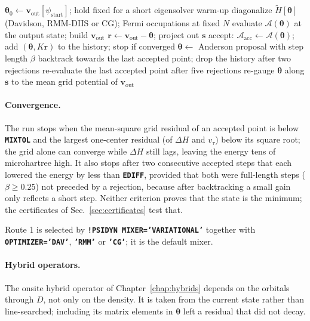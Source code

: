 \documentclass[11pt,a4paper,oneside]{book}
\newcommand{\vth}{\bm\theta}
\newcommand{\vout}{\bm v_{\mathrm{out}}}
\newcommand{\key}[1]{\textbf{\texttt{#1}}}
\begin{document}
\begin{algorithm}[t]
\caption{Hamiltonian-space variational SCF (Route 1).}
\begin{algorithmic}[1]
\State $\vth_0\gets\vout[\psi_{\mathrm{start}}]$; hold fixed for a short eigensolver warm-up
\Loop
  \State diagonalize $\tilde H[\vth]$ (Davidson, RMM-DIIS or CG); Fermi occupations at fixed $N$
  \State evaluate $\mathcal A(\vth)$ at the output state; build $\vout$
  \State $\bm r\gets\vout-\vth$; project out $\bm s$
  \If{$\mathcal A(\vth)\le\mathcal A_{\mathrm{acc}}+\epsilon$}
    \State accept: $\mathcal A_{\mathrm{acc}}\gets\mathcal A(\vth)$; add $(\vth,K\bm r)$ to the history; stop if converged
    \State $\vth\gets$ Anderson proposal with step length $\beta$
  \Else
    \State backtrack towards the last accepted point; drop the history after two rejections
    \State re-evaluate the last accepted point after five rejections
  \EndIf
  \State re-gauge $\vth$ along $\bm s$ to the mean grid potential of $\vout$
\EndLoop
\end{algorithmic}
\end{algorithm}

\paragraph{Convergence.} The run stops when the mean-square grid
residual of an accepted point is below \key{MIXTOL} and the largest
one-center residual (of $\Delta H$ and $v_\tau$) below its square root;
the grid alone can converge while $\Delta H$ still lags, leaving the energy
tens of microhartree high. It also stops after two consecutive accepted
steps that each lowered the energy by less than \key{EDIFF}, provided
that both were full-length steps ($\beta\ge0.25$) not preceded by a
rejection, because after backtracking a small gain only reflects a
short step. Neither criterion proves that the state is the minimum; the
certificates of Sec.~\ref{sec:certificates} test that.

Route 1 is selected by \key{!PSIDYN MIXER='VARIATIONAL'} together with
\key{OPTIMIZER='DAV'}, \key{'RMM'} or \key{'CG'}; it is the default mixer.

\paragraph{Hybrid operators.} The onsite hybrid operator of
Chapter~\ref{chap:hybrids} depends on the orbitals through $D$, not only
on the density. It is taken from the current state rather than
line-searched; including its matrix elements in $\vth$ left a residual
that did not decay.
\end{document}
